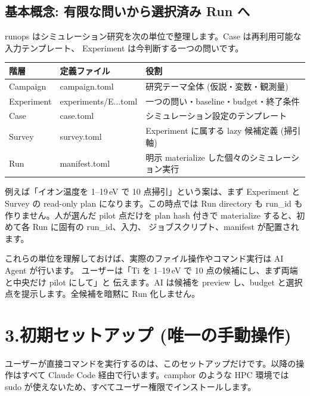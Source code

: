 \documentclass[a4paper,11pt]{article}
\newenvironment{infobox}{%
  \medskip\noindent
  \fboxrule=0.5pt\fboxsep=8pt
  \fcolorbox{infoframe}{infobg}\bgroup\minipage{\dimexpr\linewidth-2\fboxsep-2\fboxrule}
}{%
  \endminipage\egroup\medskip
}
\begin{document}
\subsection*{\color{accent} 基本概念: 有限な問いから選択済み Run へ}

runops はシミュレーション研究を次の単位で整理します。Case は再利用可能な入力テンプレート、
Experiment は今判断する一つの問いです。

\begin{center}
\begin{tabular}{lll}
\toprule
\textbf{階層} & \textbf{定義ファイル} & \textbf{役割} \\
\midrule
Campaign & campaign.toml & 研究テーマ全体 (仮説・変数・観測量) \\
Experiment & experiments/E...toml & 一つの問い・baseline・budget・終了条件 \\
Case & case.toml & シミュレーション設定のテンプレート \\
Survey & survey.toml & Experiment に属する lazy 候補定義 (掃引軸) \\
Run & manifest.toml & 明示 materialize した個々のシミュレーション実行 \\
\bottomrule
\end{tabular}
\end{center}

例えば「イオン温度を 1--19\,eV で 10 点掃引」という案は、まず Experiment と Survey の
read-only plan になります。この時点では Run directory も run\_id も作りません。人が選んだ
pilot 点だけを plan hash 付きで materialize すると、初めて各 Run に固有の run\_id、入力、
ジョブスクリプト、manifest が配置されます。

\begin{infobox}
これらの単位を理解しておけば、実際のファイル操作やコマンド実行は AI Agent が行います。
ユーザーは「Ti を 1--19\,eV で 10 点の候補にし、まず両端と中央だけ pilot にして」と
伝えます。AI は候補を preview し、budget と選択点を提示します。全候補を暗黙に Run 化しません。
\end{infobox}

\section*{\color{darkblue} 3.\quad 初期セットアップ (唯一の手動操作)}

ユーザーが直接コマンドを実行するのは、このセットアップだけです。以降の操作はすべて Claude Code 経由で行います。camphor のような HPC 環境では sudo が使えないため、すべてユーザー権限でインストールします。
\end{document}
